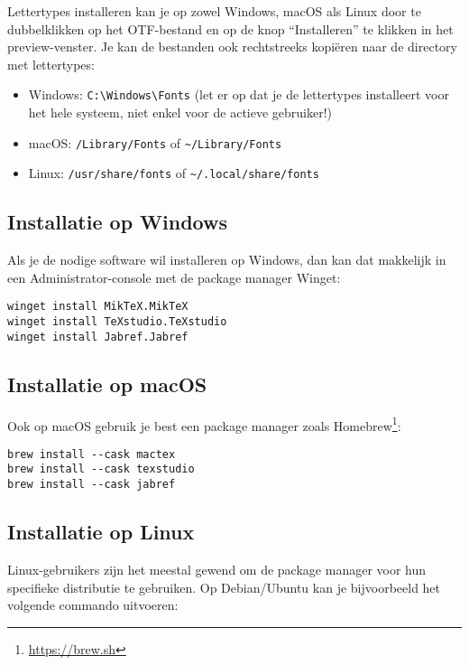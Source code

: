 Lettertypes installeren kan je op zowel Windows, macOS als Linux door te dubbelklikken op het OTF-bestand en op de knop ``Installeren'' te klikken in het preview-venster. Je kan de bestanden ook rechtstreeks kopiëren naar de directory met lettertypes:

\begin{itemize}
  \item Windows: \verb+C:\Windows\Fonts+ (let er op dat je de lettertypes installeert voor het hele systeem, niet enkel voor de actieve gebruiker!)
  \item macOS: \verb+/Library/Fonts+ of \verb+~/Library/Fonts+
  \item Linux: \verb+/usr/share/fonts+ of \verb+~/.local/share/fonts+
\end{itemize}

\subsection{Installatie op Windows}%
\label{ssec:installatie-op-windows}

Als je de nodige software wil installeren op Windows, dan kan dat makkelijk in een Administrator-console met de package manager Winget:

\begin{verbatim}
winget install MikTeX.MikTeX
winget install TeXstudio.TeXstudio
winget install Jabref.Jabref
\end{verbatim}

\subsection{Installatie op macOS}%
\label{ssec:installatie-op-macos}

Ook op macOS gebruik je best een package manager zoals Homebrew\footnote{\url{https://brew.sh}}:

\begin{verbatim}
brew install --cask mactex
brew install --cask texstudio
brew install --cask jabref
\end{verbatim}

\subsection{Installatie op Linux}%
\label{ssec:installatie-op-linux}

Linux-gebruikers zijn het meestal gewend om de package manager voor hun specifieke distributie te gebruiken. Op Debian/Ubuntu kan je bijvoorbeeld het volgende commando uitvoeren:


